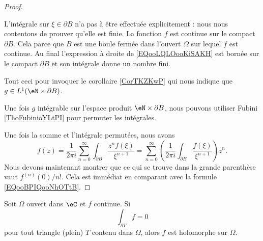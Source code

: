 \begin{proof}
\begin{subproof}
            L'intégrale sur \( \xi\in \partial B\) n'a pas à être effectuée explicitement : nous nous contentons de prouver qu'elle est finie.
            La fonction \( f\) est continue sur le compact \( \partial B\). Cela parce que \( B\) est une boule fermée dans l'ouvert \( \Omega\) sur lequel \( f\) est continue. Au final l'expression à droite de \eqref{EQooLQLOooKiSAKH} est bornée sur le compact \( \partial B\) et son intégrale donne un nombre fini.

            Tout ceci pour invoquer le corollaire \ref{CorTKZKwP} qui nous indique que \( g\in L^1(\eN\times \partial B)\).

            Une fois \( g\) intégrable sur l'espace produit \( \eN\times \partial B\), nous pouvons utiliser Fubini \ref{ThoFubinioYLtPI} pour permuter les intégrales.
    \end{subproof}

    Une fois la somme et l'intégrale permutées, nous avons
    \begin{equation} \label{EqXSgZGw}
            f(z)=\frac{1}{ 2\pi i }\sum_{n=0}^{\infty}\int_{\partial B}\frac{ z^nf(\xi) }{ \xi^{n+1} }
            =\sum_{n=0}^{\infty}\left( \frac{1}{ 2\pi i }\int_{\partial B}\frac{ f(\xi) }{ \xi^{n+1} } \right)z^n.
    \end{equation}
    Nous devons maintenant montrer que ce qui se trouve dans la grande parenthèse vaut \( f^{(n)}(0)/n!\). Cela est immédiat en comparant avec la formule \eqref{EQooBPIQooNhOTtB}.

\end{proof}

\begin{proposition}   \label{ThoRckxes}
    Soit \( \Omega\) ouvert dans \( \eC\) et \( f\) continue. Si
    \begin{equation}
        \int_{\partial T}f=0
    \end{equation}
    pour tout triangle (plein) \( T\) contenu dans \( \Omega\), alors \( f\) est holomorphe sur \( \Omega\).
\end{proposition}

